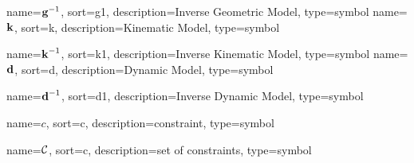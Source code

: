 	{%
		name={\ensuremath{{\vecfunc{g}^{-1}}}},
		sort=g1,
		description=Inverse Geometric Model,
		type=symbol
	}
	\newcommand{\invgeometricmodel}{\gls{sym:invgeometricmodel}}
	{%
		name={\ensuremath{\vecfunc{k}}},
		sort=k,
		description=Kinematic Model,
		type=symbol
	}
	\newcommand{\kinematicmodel}{\gls{sym:kinematicmodel}}

	{%
		name={\ensuremath{{\vecfunc{k}^{-1}}}},
		sort=k1,
		description=Inverse Kinematic Model,
		type=symbol
	}
	\newcommand{\invkinematicmodel}{\gls{sym:invkinematicmodel}}
	{%
		name={\ensuremath{\vecfunc{d}}},
		sort=d,
		description=Dynamic Model,
		type=symbol
	}
	\newcommand{\dynamicmodel}{\gls{sym:dynamicmodel}}

	{%
		name={\ensuremath{{\vecfunc{d}^{-1}}}},
		sort=d1,
		description=Inverse Dynamic Model,
		type=symbol
	}
	\newcommand{\invdynamicmodel}{\gls{sym:invdynamicmodel}}

	{%
		name=\ensuremath{c},
		sort=c,
		description=constraint,
		type=symbol
	}
	\newcommand{\constraint}{\gls{sym:constraint}}

	{%
		name=\ensuremath{\set{C}},
		sort=c,
		description=set of constraints,
		type=symbol
	}
	\newcommand{\setofconstraints}{\gls{sym:setofconstraints}}

